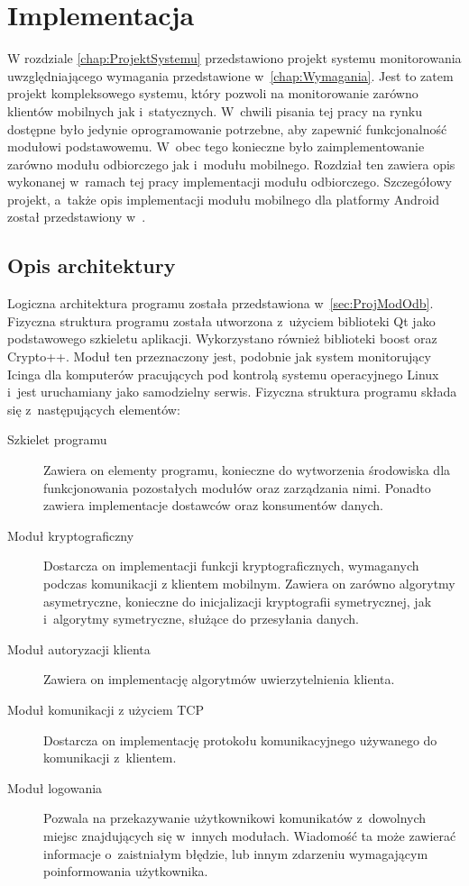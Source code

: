\chapter{Implementacja}
\label{chap:Implementacja}

W rozdziale \ref{chap:ProjektSystemu} przedstawiono projekt systemu
monitorowania uwzględniającego wymagania przedstawione
w~\ref{chap:Wymagania}. Jest to zatem projekt kompleksowego systemu,
który pozwoli na monitorowanie zarówno klientów mobilnych jak
i~statycznych. W~chwili pisania tej pracy na rynku dostępne było
jedynie oprogramowanie potrzebne, aby zapewnić funkcjonalność modułowi
podstawowemu. W~obec tego konieczne było zaimplementowanie zarówno
modułu odbiorczego jak i~modułu mobilnego. Rozdział ten zawiera opis
wykonanej w~ramach tej pracy implementacji modułu
odbiorczego. Szczegółowy projekt, a~także opis implementacji modułu
mobilnego dla platformy Android został przedstawiony
w~\cite{book:pracaKubika}.

\section[Opis architektury][Opis architektury]{Opis architektury}

Logiczna architektura programu została przedstawiona
w~\ref{sec:ProjModOdb}. Fizyczna struktura programu została utworzona
z~użyciem biblioteki Qt jako podstawowego szkieletu
aplikacji. Wykorzystano również biblioteki boost oraz Crypto++. Moduł
ten przeznaczony jest, podobnie jak system monitorujący Icinga dla
komputerów pracujących pod kontrolą systemu operacyjnego Linux i~jest
uruchamiany jako samodzielny serwis. Fizyczna struktura programu
składa się z~następujących elementów:

\begin{description}
\item[Szkielet programu] Zawiera on elementy programu, konieczne do
  wytworzenia środowiska dla funkcjonowania pozostałych modułów oraz
  zarządzania nimi. Ponadto zawiera implementacje dostawców oraz
  konsumentów danych.
\item[Moduł kryptograficzny] Dostarcza on implementacji funkcji
  kryptograficznych, wymaganych podczas komunikacji z klientem
  mobilnym. Zawiera on zarówno algorytmy asymetryczne, konieczne do
  inicjalizacji kryptografii symetrycznej, jak i~algorytmy symetryczne,
  służące do przesyłania danych.
\item[Moduł autoryzacji klienta] Zawiera on implementację algorytmów
  uwierzytelnienia klienta.
\item[Moduł komunikacji z użyciem TCP] Dostarcza on implementację
  protokołu komunikacyjnego używanego do komunikacji z~klientem.
\item[Moduł logowania] Pozwala na przekazywanie użytkownikowi
  komunikatów z~dowolnych miejsc znajdujących się w~innych
  modułach. Wiadomość ta może zawierać informacje o~zaistniałym
  błędzie, lub innym zdarzeniu wymagającym poinformowania użytkownika.
\end{description}


